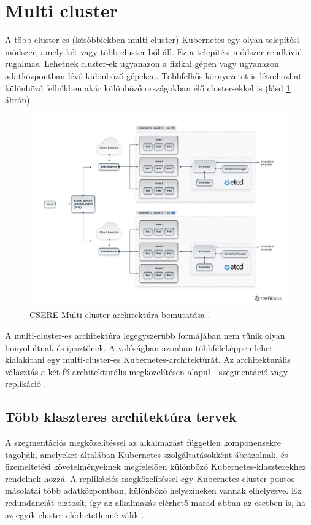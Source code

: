 \section{Multi cluster}
A több cluster-es (későbbiekben multi-cluster) Kubernetes egy olyan telepítési módszer, amely két vagy több cluster-ből áll.
Ez a telepítési módszer rendkívül rugalmas. Lehetnek cluster-ek ugyanazon a fizikai gépen vagy ugyanazon adatközpontban lévő különböző gépeken.
Többfelhős környezetet is létrehozhat különböző felhőkben akár különböző országokban élő cluster-ekkel is (lásd \ref{multi-cluster} ábrán).

\begin{figure}[ht]
    \centering
         \includegraphics[width=1.0\textwidth]{figures/istio/multicluster.png}
          \caption{CSERE Multi-cluster architektúra bemutatása \cite{multicluster}.}
           \label{multi-cluster}
\end{figure}

A multi-cluster-es architektúra legegyszerűbb formájában nem tűnik olyan bonyolultnak és ijesztőnek.
A valóságban azonban többféleképpen lehet kialakítani egy multi-cluster-es Kubernetes-architektúrát.
Az architekturális választás a két fő architekturális megközelítésen alapul - szegmentáció vagy replikáció \cite{multicluster}.

\subsection{Több klaszteres architektúra tervek}
A szegmentációs megközelítéssel az alkalmazást független komponensekre tagolják, amelyeket általában Kubernetes-szolgáltatásokként ábrázolnak, és üzemeltetési követelményeknek megfelelően különböző Kubernetes-klaszterekhez rendelnek hozzá.
A replikációs megközelítéssel egy Kubernetes cluster pontos másolatai több adatközpontban, különböző helyszíneken vannak elhelyezve.
Ez redundanciát biztosít, így az alkalmazás elérhető marad abban az esetben is, ha az egyik cluster elérhetetlenné válik \cite{multicluster}.

